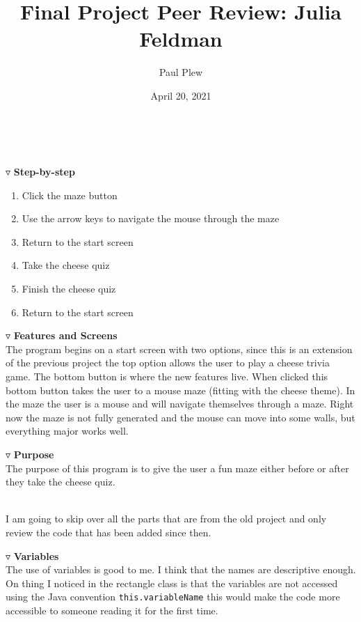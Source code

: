 \documentclass[12 pt]{article}
\title{Final Project Peer Review: Julia Feldman}
\author{Paul Plew}
\date{April 20, 2021}
\renewcommand{\section}[1]{\bigskip \par \noindent {$\blacktriangledown$ \large \bf #1} \\[2ex] \hspace*{0.75cm}}
\renewcommand{\subsection}[1]{\medskip \par {$\triangledown$ \bf #1} \\[1ex] \hspace*{1cm}}
\begin{document}
\maketitle

\section{User Story}
\vspace*{-0.75cm}
\subsection{Step-by-step}
\vspace*{-0.75cm}
\begin{enumerate}
	\item Click the maze button
	\item Use the arrow keys to navigate the mouse through the maze
	\item Return to the start screen
	\item Take the cheese quiz
	\item Finish the cheese quiz
	\item Return to the start screen
\end{enumerate}
\subsection{Features and Screens}
The program begins on a start screen with two options, since this is an extension of the previous project the top option allows the user to play a cheese trivia game. The bottom button is where the new features live. When clicked this bottom button takes the user to a mouse maze (fitting with the cheese theme). In the maze the user is a mouse and will navigate themselves through a maze. Right now the maze is not fully generated and the mouse can move into some walls, but everything major works well. 
\subsection{Purpose}
The purpose of this program is to give the user a fun maze either before or after they take the cheese quiz. 
\newpage
\section{Review}
I am going to skip over all the parts that are from the old project and only review the code that has been added since then. 
\subsection{Variables}
The use of variables is good to me. I think that the names are descriptive enough. On thing I noticed in the rectangle class is that the variables are not accessed using the Java convention \verb|this.variableName| this would make the code more accessible to someone reading it for the first time. 
\end{document}
